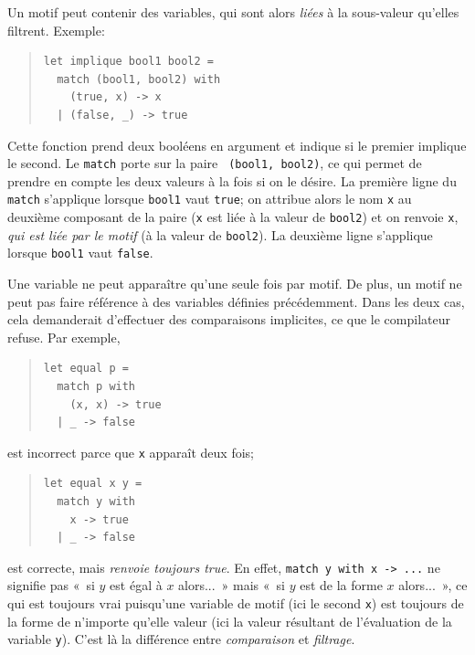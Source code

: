 \documentclass[11pt, a4paper]{article}
\begin{document}
\noindent Un motif peut contenir des variables, qui sont alors
\emph{liées} à la sous-valeur qu'elles filtrent. Exemple:
\begin{quote}
\begin{verbatim}
let implique bool1 bool2 =
  match (bool1, bool2) with
    (true, x) -> x
  | (false, _) -> true
\end{verbatim}
\end{quote}
Cette fonction prend deux booléens en argument et indique si le
premier implique le second. Le {\tt match} porte sur la paire {\tt
(bool1, bool2)}, ce qui permet de prendre en compte les deux valeurs à
la fois si on le désire.  La première ligne du {\tt match} s'applique
lorsque {\tt bool1} vaut {\tt true}; on attribue alors le nom {\tt x}
au deuxième composant de la paire (\texttt{x} est liée à la valeur de
\texttt{bool2}) et on renvoie {\tt x}, \emph{qui est liée par le
motif} (à la valeur de \texttt{bool2}). La deuxième ligne s'applique
lorsque {\tt bool1} vaut {\tt false}.

Une variable ne peut apparaître qu'une seule fois par motif. De plus,
un motif ne peut pas faire référence à des variables définies
précédemment. Dans les deux cas, cela demanderait d'effectuer des
comparaisons implicites, ce que le compilateur refuse. Par exemple,
\begin{quote}
\begin{verbatim}
let equal p =
  match p with
    (x, x) -> true
  | _ -> false
\end{verbatim}
\end{quote}
est incorrect parce que {\tt x} apparaît deux fois;
\begin{quote}
\begin{verbatim}
let equal x y =
  match y with
    x -> true
  | _ -> false
\end{verbatim}
\end{quote}
est correcte, mais {\em renvoie toujours true}. En effet, {\tt match y
with x -> ...} ne signifie pas «~si $y$ est égal à $x$ alors...~» mais
«~si $y$ est de la forme $x$ alors...~», ce qui est toujours vrai
puisqu'une variable de motif (ici le second \texttt{x}) est toujours
de la forme de n'importe qu'elle valeur (ici la valeur résultant de
l'évaluation de la variable \texttt{y}). C'est là la différence entre
{\em comparaison} et {\em filtrage}.
\end{document}

